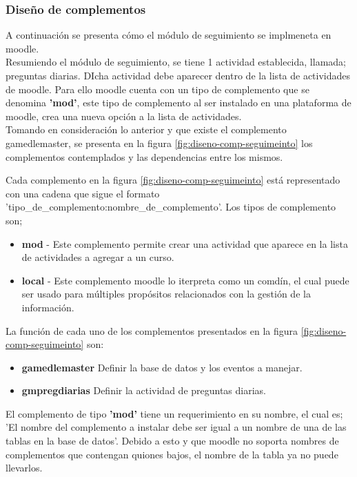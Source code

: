 

\subsubsection{Diseño de complementos}



A continuación se presenta cómo el módulo de seguimiento
se implmeneta en moodle.\\


\noindent Resumiendo el módulo de seguimiento, se tiene 1 actividad establecida, llamada; 
preguntas diarias. 
DIcha actividad debe aparecer dentro de la lista de actividades de moodle. Para ello 
moodle cuenta con un tipo de complemento que se denomina \textbf{'mod'}, este tipo de complemento al ser instalado 
en una plataforma de moodle, crea una nueva opción a la lista de actividades.\\

\noindent Tomando en consideración lo anterior y que existe el complemento gamedlemaster, se presenta en la figura \ref{fig:diseno-comp-seguimeinto}
los complementos contemplados y las dependencias entre los mismos.




Cada complemento en la figura \ref{fig:diseno-comp-seguimeinto} está representado con una cadena que sigue el formato 'tipo\_de\_complemento:nombre\_de\_complemento'. Los tipos de complemento son;
\begin{itemize}
    \item \textbf{mod} - Este complemento permite crear una actividad que aparece en la lista de actividades a agregar a un curso.
    \item \textbf{local} -  Este complemento moodle lo iterpreta como un comdín, el cual puede ser usado para múltiples propósitos relacionados con la gestión de la información.
\end{itemize}

La función de cada uno de los complementos presentados en la figura \ref{fig:diseno-comp-seguimeinto} son:


\begin{itemize}
    \item \textbf{gamedlemaster} Definir la base de datos y los eventos a manejar.
    \item \textbf{gmpregdiarias} Definir la actividad de preguntas diarias.
\end{itemize}

El complemento de tipo  \textbf{'mod'} tiene un requerimiento en su nombre, el cual es; 'El nombre del complemento a instalar debe ser igual a un nombre
de una de las tablas en la base de datos'. Debido a esto y que moodle no soporta nombres de complementos que contengan quiones bajos, el
nombre de la tabla ya no puede llevarlos.\\




